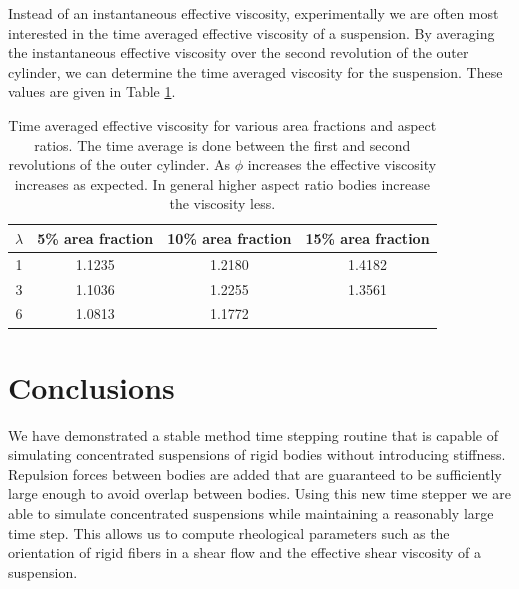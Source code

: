 \documentclass[preprint, 10pt]{elsarticle}
\begin{document}
Instead of an instantaneous effective viscosity, experimentally we are often most interested in the time averaged effective viscosity of a suspension. By averaging the instantaneous effective viscosity over the second revolution of the outer cylinder, we can determine the time averaged viscosity for the suspension. These values are given in Table \ref{tab:viscosity}.
\begin{table}[!h]
\begin{center}
\begin{tabular}{c| c | c |  c}
$\lambda$ & 5\% area fraction  & 10\% area fraction  & 15\% area fraction\\
\hline
1 & 1.1235 & 1.2180 & 1.4182 \\
3 & 1.1036& 1.2255 &  1.3561\\
6 & 1.0813 & 1.1772 & 
\end{tabular}
\end{center}
\caption{Time averaged effective viscosity for various area fractions
and aspect ratios. The time average is done between the first and second
revolutions of the outer cylinder. As $\phi$ increases the effective
viscosity increases as expected. In general higher aspect ratio bodies
increase the viscosity less. }\label{tab:viscosity}
\end{table}




\FloatBarrier
\section{Conclusions\label{s:conclusions}}
We have demonstrated a stable method time stepping routine that is
capable of simulating concentrated suspensions of rigid bodies without
introducing stiffness. Repulsion forces between bodies are added that
are guaranteed to be sufficiently large enough to avoid overlap between
bodies. Using this new time stepper we are able to simulate concentrated suspensions while maintaining a reasonably large time step. This allows us to compute rheological parameters such as the orientation of rigid fibers in a shear flow and the effective shear viscosity of a suspension. 
\end{document}
